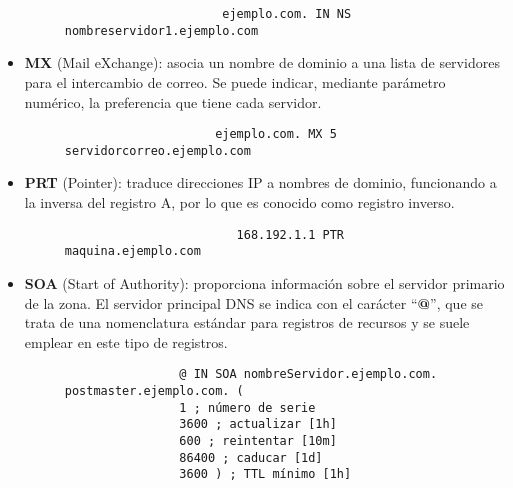 \begin{itemize}
    \begin{figure}[H]
        \begin{tcolorbox}[sharp corners, colback=yellow!30, colframe=white!20]
            \scriptsize
            \begin{verbatim}
                      ejemplo.com. IN NS nombreservidor1.ejemplo.com \end{verbatim}
        \end{tcolorbox}
    \end{figure}

    \item \textbf{MX} (Mail eXchange): asocia un nombre de dominio a una lista de servidores para el intercambio de correo. Se puede indicar, mediante parámetro numérico, la preferencia que tiene cada servidor.

        \begin{figure}[H]
        \begin{tcolorbox}[sharp corners, colback=yellow!30, colframe=white!20]
            \scriptsize
            \begin{verbatim}
                     ejemplo.com. MX 5 servidorcorreo.ejemplo.com\end{verbatim}
        \end{tcolorbox}
    \end{figure}

    \item \textbf{PRT} (Pointer): traduce direcciones IP a nombres de dominio, funcionando a la inversa del registro A, por lo que es conocido como registro inverso.
            \begin{figure}[H]
        \begin{tcolorbox}[sharp corners, colback=yellow!30, colframe=white!20]
            \scriptsize
            \begin{verbatim}
                        168.192.1.1 PTR maquina.ejemplo.com\end{verbatim}
        \end{tcolorbox}
    \end{figure}

    \item \textbf{SOA} (Start of Authority): proporciona información sobre el servidor primario de la zona. El servidor principal DNS se indica con el carácter ``\textbf{@}'', que se trata de una nomenclatura estándar para registros de recursos y se suele emplear en este tipo de registros.

                \begin{figure}[H]
        \begin{tcolorbox}[sharp corners, colback=yellow!30, colframe=white!20]
            \scriptsize
            \begin{verbatim}
                @ IN SOA nombreServidor.ejemplo.com. postmaster.ejemplo.com. (
                1 ; número de serie
                3600 ; actualizar [1h]
                600 ; reintentar [10m]
                86400 ; caducar [1d]
                3600 ) ; TTL mínimo [1h]\end{verbatim}
        \end{tcolorbox}
    \end{figure}


\end{itemize}
